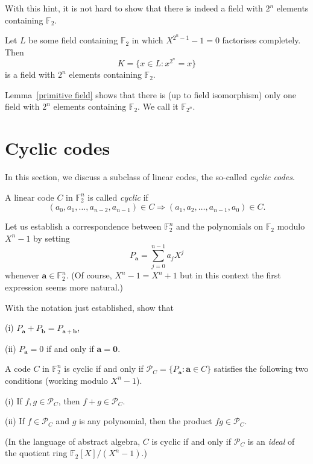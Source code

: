 With this hint, it is not hard to show that there is
indeed a field with $2^{n}$ elements
containing ${\mathbb F}_{2}$.
\begin{lemma}\label{Galois}
Let $L$ be some field containing
${\mathbb F}_{2}$ in which $X^{2^{n}-1}-1=0$
factorises completely. Then
\[K=\{x\in L:x^{2^{n}}=x\}\]
is a field with $2^{n}$ elements
containing ${\mathbb F}_{2}$.
\end{lemma}

Lemma~\ref{primitive field} shows that
there is (up to field isomorphism) only one
field with $2^{n}$ elements
containing ${\mathbb F}_{2}$.
We call it ${\mathbb F}_{2^{n}}$.
\section{Cyclic codes} In this section, we
discuss a subclass of linear codes, the
so-called \emph{cyclic codes}.
\begin{definition} A linear code $C$
in ${\mathbb F}^{n}_{2}$
is called \emph{cyclic} if
\[(a_{0},a_{1},\dots,a_{n-2},a_{n-1})\in C
\Rightarrow (a_{1},a_{2},\dots,a_{n-1},a_{0})\in C.\]
\end{definition}
Let us establish a correspondence between
${\mathbb F}^{n}_{2}$ and the polynomials
on ${\mathbb F}_{2}$ modulo $X^{n}-1$
by setting
\[P_{\mathbf a}=\sum_{j=0}^{n-1}a_{j}X^{j}\]
whenever ${\mathbf a}\in {\mathbb F}_{2}^{n}$.
(Of course, $X^{n}-1=X^{n}+1$ but in this context
the first expression seems more natural.)
\begin{exercise} With the notation
just established, show that

(i) $P_{\mathbf a}+P_{\mathbf b}=P_{{\mathbf a}+{\mathbf b}}$,

(ii) $P_{\mathbf a}=0$ if and only if ${\mathbf a}={\boldsymbol 0}$.
\end{exercise}

\begin{lemma} A  code $C$
in ${\mathbb F}^{n}_{2}$
is cyclic if and only if
${\mathcal P}_{C}=\{P_{\mathbf a}:{\mathbf a}\in C\}$
satisfies the following two
conditions (working modulo $X^{n}-1$).

(i) If $f,g\in {\mathcal P}_{C}$, then $f+g\in {\mathcal P}_{C}$.

(ii) If $f\in {\mathcal P}_{C}$ and $g$ is
any polynomial, then the product $fg\in{\mathcal P}_{C}$.
\end{lemma}
\noindent
(In the language of abstract algebra, $C$
is cyclic if and only if
${\mathcal P}_{C}$ is an \emph{ideal} of the
quotient ring ${\mathbb F}_{2}[X]/(X^{n}-1)$.)

